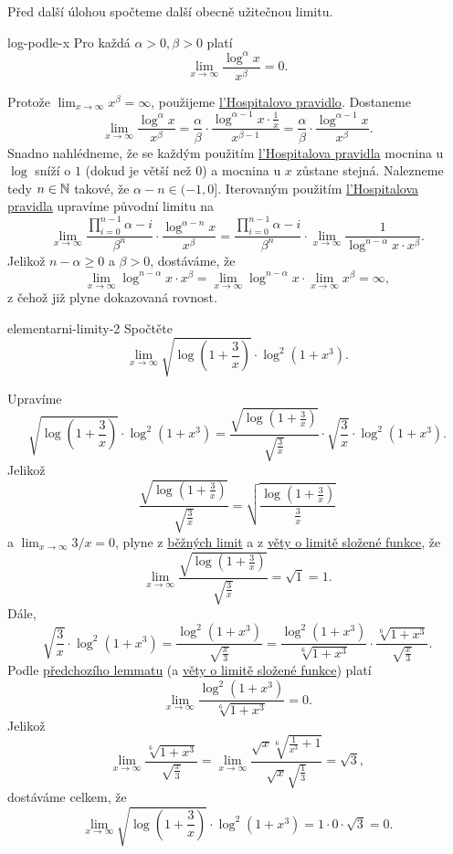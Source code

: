 Před další úlohou spočteme další obecně užitečnou limitu.
\begin{lemma}{}{log-podle-x}
 Pro každá $\alpha>0,\beta>0$ platí
 \[
  \lim_{x \to \infty} \frac{\log^{\alpha}x}{x^{\beta}} = 0.
 \]
\end{lemma}
\begin{lemproof}
 Protože $\lim_{x \to \infty} x^{\beta} = \infty$, použijeme
 \hyperref[thm:lhospital]{l'Hospitalovo pravidlo}. Dostaneme
 \[
  \lim_{x \to \infty} \frac{\log^{\alpha} x}{x^{\beta}} = \frac{\alpha}{\beta}
  \cdot \frac{\log^{\alpha - 1}x \cdot \frac{1}{x}}{x^{\beta - 1}} =
  \frac{\alpha}{\beta} \cdot \frac{\log^{\alpha-1} x}{x^{\beta}}.
 \]
 Snadno nahlédneme, že se každým použitím \hyperref[thm:lhospital]{l'Hospitalova
 pravidla} mocnina u $\log$ sníží o $1$ (dokud je větší než $0$) a mocnina u $x$
 zůstane stejná. Nalezneme tedy $n \in \mathbb{N}$ takové, že $\alpha - n \in (-1,0]$.
 Iterovaným použitím \hyperref[thm:lhospital]{l'Hospitalova pravidla} upravíme
 původní limitu na
 \[
  \lim_{x \to \infty} \frac{\prod_{i=0}^{n-1} \alpha - i}{\beta^{n}} \cdot
  \frac{\log^{\alpha - n} x}{x^{\beta}} = \frac{\prod_{i=0}^{n-1} \alpha -
  i}{\beta^{n}} \cdot \lim_{x \to \infty} \frac{1}{\log^{n-\alpha}x \cdot
  x^{\beta}}.
 \]
 Jelikož $n-\alpha \geq 0$ a $\beta>0$, dostáváme, že
 \[
  \lim_{x \to \infty} \log^{n-\alpha}x \cdot x^{\beta} = \lim_{x \to \infty}
  \log^{n-\alpha}x \cdot \lim_{x \to \infty} x^{\beta} = \infty,
 \]
 z čehož již plyne dokazovaná rovnost.
\end{lemproof}

\begin{problem}{}{elementarni-limity-2}
 Spočtěte
 \[
  \lim_{x \to \infty} \sqrt{\log \left( 1 + \frac{3}{x} \right)} \cdot
  \log^2(1+x^3).
 \]
\end{problem}
\begin{probsol}
 Upravíme
 \[
  \sqrt{\log \left( 1 + \frac{3}{x} \right)} \cdot \log^2(1+x^3) =
  \frac{\sqrt{\log \left( 1 + \frac{3}{x} \right)}}{\sqrt{\frac{3}{x}}} \cdot
  \sqrt{\frac{3}{x}} \cdot \log^2(1 + x^3).
 \]
 Jelikož
 \[
  \frac{\sqrt{\log \left( 1 + \frac{3}{x} \right)}}{\sqrt{\frac{3}{x}}} =
  \sqrt{\frac{\log \left(1 + \frac{3}{x}\right)}{\frac{3}{x}}}
 \]
 a $\lim_{x \to \infty} 3 / x = 0$, plyne z \hyperref[prop:bezne-limity]{běžných
 limit} a z \hyperref[thm:limita-slozene-funkce]{věty o limitě složené funkce},
 že
 \[
  \lim_{x \to \infty} \frac{\sqrt{\log \left( 1 + \frac{3}{x}
  \right)}}{\sqrt{\frac{3}{x}}} = \sqrt{1} = 1.
 \]
 Dále,
 \[
  \sqrt{\frac{3}{x}} \cdot \log^2(1 + x^3) = \frac{\log^2(1 +
  x^3)}{\sqrt{\frac{x}{3}}} = \frac{\log^2(1 + x^3)}{\sqrt[6]{1+x^3}} \cdot
  \frac{\sqrt[6]{1+x^3}}{\sqrt{\frac{x}{3}}}.
 \]
 Podle \hyperref[lem:log-podle-x]{předchozího lemmatu} (a
 \hyperref[thm:limita-slozene-funkce]{věty o limitě složené funkce}) platí
 \[
  \lim_{x \to \infty} \frac{\log^2(1 + x^3)}{\sqrt[6]{1+x^3}} = 0.
 \]
 Jelikož
 \[
  \lim_{x \to \infty} \frac{\sqrt[6]{1+x^3}}{\sqrt{\frac{x}{3}}} = \lim_{x \to
  \infty} \frac{\sqrt{x} \sqrt[6]{\frac{1}{x^3} +
  1}}{\sqrt{x}\sqrt{\frac{1}{3}}} = \sqrt{3},
 \]
 dostáváme celkem, že
 \[
  \lim_{x \to \infty} \sqrt{\log \left( 1+\frac{3}{x} \right)} \cdot \log^2(1 +
  x^3) = 1 \cdot 0 \cdot \sqrt{3} = 0.
 \]
\end{probsol}

